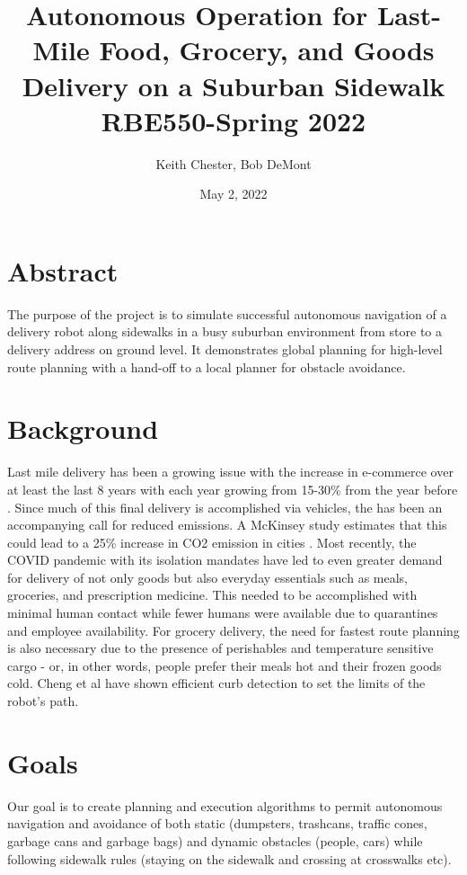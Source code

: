 \documentclass{article}
\title{Autonomous Operation for Last-Mile Food, Grocery, and Goods Delivery on a Suburban Sidewalk\\
\vspace{5mm}
\large RBE550-Spring 2022 }
\author{Keith Chester, Bob DeMont}
\date{May 2, 2022}
\begin{document}
\maketitle

\begin{multicols}{2}
\section*{Abstract}
The purpose of the project is to simulate successful autonomous navigation of a delivery robot along sidewalks in a busy suburban environment from store to a delivery address on ground level.  It demonstrates global planning for high-level route planning with a hand-off to a local planner for obstacle avoidance.

\section*{Background}
Last mile delivery has been a growing issue with the increase in e-commerce over at least the last 8 years with each year growing from 15-30\% from the year before \cite{Ecom}.  Since much of this final delivery is accomplished via vehicles, the has been an accompanying call for reduced emissions.  A McKinsey study estimates that this could lead to a 25\% increase in CO2 emission in cities \cite{Emiss}.  Most recently, the COVID pandemic with its isolation mandates have led to even greater demand for delivery of not only goods but also everyday essentials such as meals, groceries, and prescription medicine.  This needed to be accomplished with minimal human contact while fewer humans were available due to quarantines and employee availability.  For grocery delivery, the need for fastest route planning is also necessary due to the presence of perishables and temperature sensitive cargo - or, in other words, people prefer their meals hot and their frozen goods cold. Cheng et al \cite{Mcheng} have shown efficient curb detection to set the limits of the robot's path.

\section*{Goals}
Our goal is to create planning and execution algorithms to permit autonomous navigation and avoidance of both static (dumpsters, trashcans, traffic cones, garbage cans and garbage bags) and dynamic obstacles (people, cars) while following sidewalk rules (staying on the sidewalk and crossing at crosswalks etc).


\end{multicols}
\end{document}
